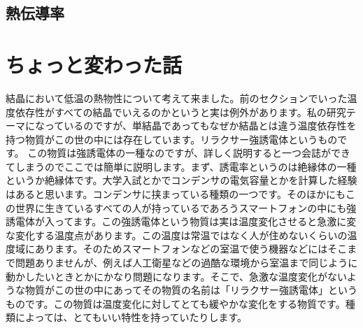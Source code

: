 \documentclass[10pt,b5paper,papersize,dvipdfmx]{jsbook}
\begin{document}
\subsection{熱伝導率}





\section{ちょっと変わった話}
結晶において低温の熱物性について考えて来ました。前のセクションでいった温度依存性がすべての結晶でいえるのかというと実は例外があります。私の研究テーマになっているのですが、単結晶であってもなぜか結晶とは違う温度依存性を持つ物質がこの世の中には存在しています。リラクサー強誘電体というものです。
この物質は強誘電体の一種なのですが、詳しく説明すると一つ会誌ができてしまうのでここでは簡単に説明します。まず、誘電率というのは絶縁体の一種というか絶縁体です。大学入試とかでコンデンサの電気容量とかを計算した経験はあると思います。コンデンサに挟まっている種類の一つです。そのほかにもこの世界に生きているすべての人が持っているであろうスマートフォンの中にも強誘電体が入ってます。この強誘電体という物質は実は温度変化させると急激に変な変化する温度点があります。この温度は常温ではなく人が住めないくらいの温度域にあります。そのためスマートフォンなどの室温で使う機器などにはそこまで問題ありませんが、例えば人工衛星などの過酷な環境から室温まで同じように動かしたいときとかにかなり問題になります。そこで、急激な温度変化がないような物質がこの世の中にあってその物質の名前は「リラクサー強誘電体」というものです。この物質は温度変化に対してとても緩やかな変化をする物質です。種類によっては、とてもいい特性を持っていたりします。
\end{document}
